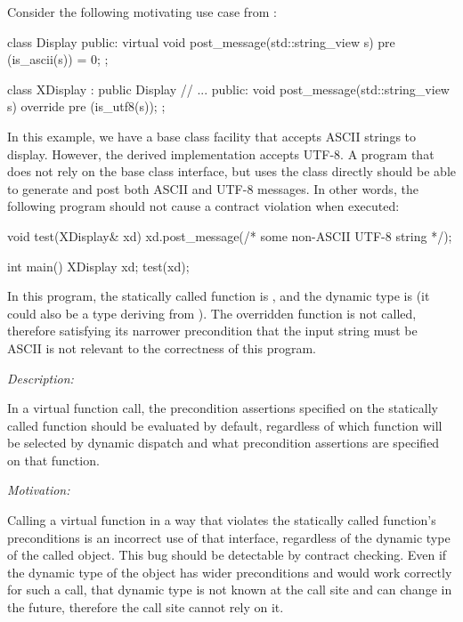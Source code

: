 Consider the following motivating use case from \cite{P0247R0}:
\begin{codeblock}
class Display {
public:
  virtual void post_message(std::string_view s)
     pre (is_ascii(s)) = 0;
};

class XDisplay : public Display {
   // ...
public:
  void post_message(std::string_view s) override
    pre (is_utf8(s));
 };
\end{codeblock}
In this example, we have a base class facility that accepts ASCII strings to display. However, the derived implementation accepts UTF-8. A program that does not rely on the  base class interface, but uses the  class directly should be able to generate and post both ASCII and UTF-8 messages. In other words, the following program should not cause a contract violation when executed:
\begin{codeblock}
void test(XDisplay& xd) {
  xd.post_message(/* some non-ASCII UTF-8 string */);
}

int main() {
  XDisplay xd;
  test(xd);
}
\end{codeblock}
In this program, the statically called function is , and the dynamic type is  (it could also be a type deriving from ). The overridden function  is not called, therefore satisfying its narrower precondition that the input string must be ASCII is not relevant to the correctness of this program.


\emph{Description:}

In a virtual function call, the precondition assertions specified on the statically called function should be evaluated by default, regardless of which function will be selected by dynamic dispatch and what  precondition assertions are specified on that function.

\emph{Motivation:}

Calling a virtual function in a way that violates the statically called function's preconditions is an incorrect use of that interface, regardless of the dynamic type of the called object. This bug should be detectable by contract checking. Even if the dynamic type of the object has wider preconditions and would work correctly for such a call, that dynamic type is not known at the call site and can change in the future, therefore the call site cannot rely on it.

